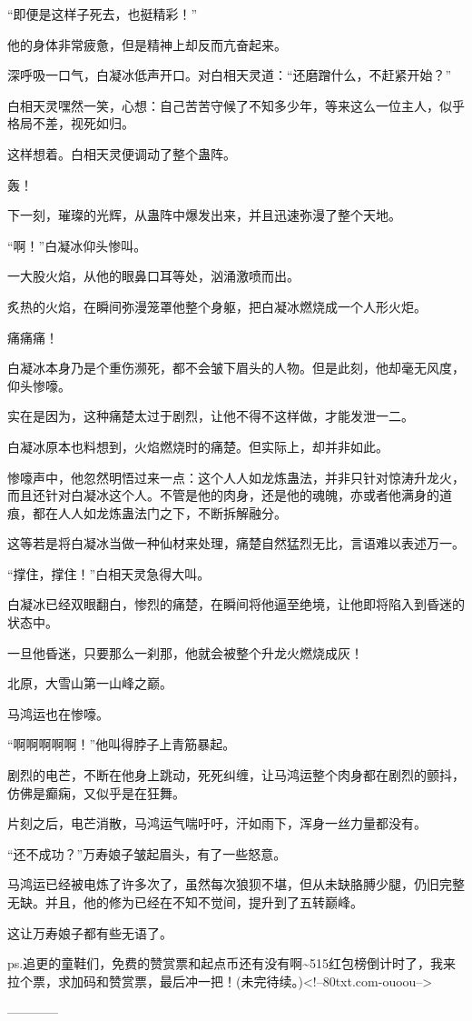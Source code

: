 \begin{this_body}
“即便是这样子死去，也挺精彩！”

他的身体非常疲惫，但是精神上却反而亢奋起来。

深呼吸一口气，白凝冰低声开口。对白相天灵道：“还磨蹭什么，不赶紧开始？”

白相天灵嘿然一笑，心想：自己苦苦守候了不知多少年，等来这么一位主人，似乎格局不差，视死如归。

这样想着。白相天灵便调动了整个蛊阵。

轰！

下一刻，璀璨的光辉，从蛊阵中爆发出来，并且迅速弥漫了整个天地。

“啊！”白凝冰仰头惨叫。

一大股火焰，从他的眼鼻口耳等处，汹涌激喷而出。

炙热的火焰，在瞬间弥漫笼罩他整个身躯，把白凝冰燃烧成一个人形火炬。

痛痛痛！

白凝冰本身乃是个重伤濒死，都不会皱下眉头的人物。但是此刻，他却毫无风度，仰头惨嚎。

实在是因为，这种痛楚太过于剧烈，让他不得不这样做，才能发泄一二。

白凝冰原本也料想到，火焰燃烧时的痛楚。但实际上，却并非如此。

惨嚎声中，他忽然明悟过来一点：这个人人如龙炼蛊法，并非只针对惊涛升龙火，而且还针对白凝冰这个人。不管是他的肉身，还是他的魂魄，亦或者他满身的道痕，都在人人如龙炼蛊法门之下，不断拆解融分。

这等若是将白凝冰当做一种仙材来处理，痛楚自然猛烈无比，言语难以表述万一。

“撑住，撑住！”白相天灵急得大叫。

白凝冰已经双眼翻白，惨烈的痛楚，在瞬间将他逼至绝境，让他即将陷入到昏迷的状态中。

一旦他昏迷，只要那么一刹那，他就会被整个升龙火燃烧成灰！

北原，大雪山第一山峰之巅。

马鸿运也在惨嚎。

“啊啊啊啊啊！”他叫得脖子上青筋暴起。

剧烈的电芒，不断在他身上跳动，死死纠缠，让马鸿运整个肉身都在剧烈的颤抖，仿佛是癫痫，又似乎是在狂舞。

片刻之后，电芒消散，马鸿运气喘吁吁，汗如雨下，浑身一丝力量都没有。

“还不成功？”万寿娘子皱起眉头，有了一些怒意。

马鸿运已经被电炼了许多次了，虽然每次狼狈不堪，但从未缺胳膊少腿，仍旧完整无缺。并且，他的修为已经在不知不觉间，提升到了五转巅峰。

这让万寿娘子都有些无语了。

ps.追更的童鞋们，免费的赞赏票和起点币还有没有啊\~{}515红包榜倒计时了，我来拉个票，求加码和赞赏票，最后冲一把！(未完待续。)<!--80txt.com-ouoou-->

------------

\end{this_body}

